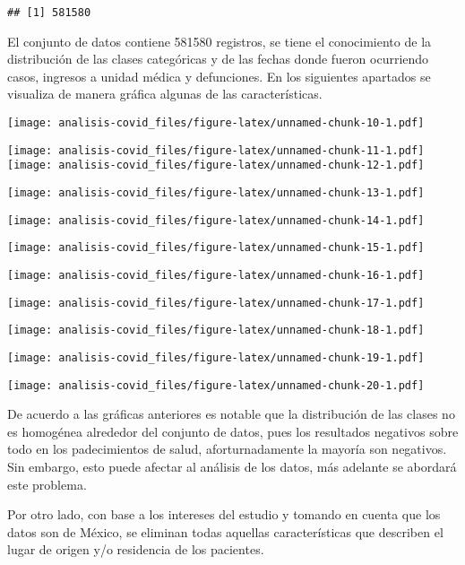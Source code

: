 \documentclass[]{article}
\begin{document}
\begin{verbatim}
## [1] 581580
\end{verbatim}

El conjunto de datos contiene 581580 registros, se tiene el conocimiento
de la distribución de las clases categóricas y de las fechas donde
fueron ocurriendo casos, ingresos a unidad médica y defunciones. En los
siguientes apartados se visualiza de manera gráfica algunas de las
características.

\texttt{[image: analisis-covid\_files/figure-latex/unnamed-chunk-10-1.pdf]}

\texttt{[image: analisis-covid\_files/figure-latex/unnamed-chunk-11-1.pdf]}
\texttt{[image: analisis-covid\_files/figure-latex/unnamed-chunk-12-1.pdf]}

\texttt{[image: analisis-covid\_files/figure-latex/unnamed-chunk-13-1.pdf]}

\texttt{[image: analisis-covid\_files/figure-latex/unnamed-chunk-14-1.pdf]}

\texttt{[image: analisis-covid\_files/figure-latex/unnamed-chunk-15-1.pdf]}

\texttt{[image: analisis-covid\_files/figure-latex/unnamed-chunk-16-1.pdf]}

\texttt{[image: analisis-covid\_files/figure-latex/unnamed-chunk-17-1.pdf]}

\texttt{[image: analisis-covid\_files/figure-latex/unnamed-chunk-18-1.pdf]}

\texttt{[image: analisis-covid\_files/figure-latex/unnamed-chunk-19-1.pdf]}

\texttt{[image: analisis-covid\_files/figure-latex/unnamed-chunk-20-1.pdf]}

De acuerdo a las gráficas anteriores es notable que la distribución de
las clases no es homogénea alrededor del conjunto de datos, pues los
resultados negativos sobre todo en los padecimientos de salud,
aforturnadamente la mayoría son negativos. Sin embargo, esto puede
afectar al análisis de los datos, más adelante se abordará este
problema.

Por otro lado, con base a los intereses del estudio y tomando en cuenta
que los datos son de México, se eliminan todas aquellas características
que describen el lugar de origen y/o residencia de los pacientes.
\end{document}
